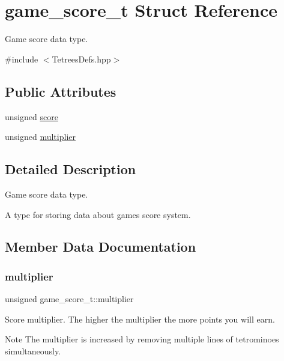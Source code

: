 \hypertarget{structgame__score__t}{}\section{game\+\_\+score\+\_\+t Struct Reference}
\label{structgame__score__t}


Game score data type.  




{\ttfamily \#include $<$Tetrees\+Defs.\+hpp$>$}

\subsection*{Public Attributes}
\begin{DoxyCompactItemize}
\item 
unsigned \mbox{\hyperlink{structgame__score__t_ad31c74c891223f5649797cbd13a86de8}{score}}
\item 
unsigned \mbox{\hyperlink{structgame__score__t_a9dbd70f0cf1f4258895ff90db228297d}{multiplier}}
\end{DoxyCompactItemize}


\subsection{Detailed Description}
Game score data type. 

A type for storing data about game\textquotesingle{}s score system. 

\subsection{Member Data Documentation}
\mbox{\label{structgame__score__t_a9dbd70f0cf1f4258895ff90db228297d}} 
\subsubsection{\texorpdfstring{multiplier}{multiplier}}
{\footnotesize\ttfamily unsigned game\+\_\+score\+\_\+t\+::multiplier}

Score multiplier. The higher the multiplier the more points you will earn. \begin{DoxyNote}{Note}
The multiplier is increased by removing multiple lines of tetrominoes simultaneously. 
\end{DoxyNote}
\mbox{\label{structgame__score__t_ad31c74c891223f5649797cbd13a86de8}} 
